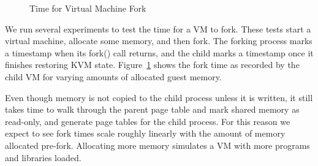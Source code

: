 \begin{figure}[t]


  \caption{Time for Virtual Machine Fork}
  \label{fig:fork-time}
\end{figure}

 We run several experiments to test the time for a VM to fork. These tests start a virtual machine, allocate some memory, and then fork. The forking process marks a timestamp when its fork() call returns, and the child marks a timestamp once it finishes restoring KVM state. Figure~\ref{fig:fork-time} shows the fork time as recorded by the child VM for varying amounts of allocated guest memory.

Even though memory is not copied to the child process unless it is written, it still takes time to walk through the parent page table and mark shared memory as read-only, and generate page tables for the child process. For this reason we expect to see fork times scale roughly linearly with the amount of memory allocated pre-fork. Allocating more memory simulates a VM with more programs and libraries loaded.

